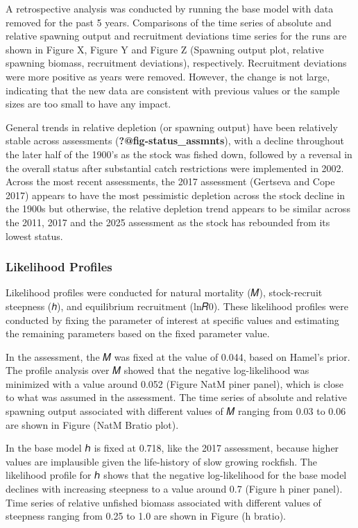 \documentclass[
]{scrartcl}
\begin{document}
A retrospective analysis was conducted by running the base model with
data removed for the past 5 years. Comparisons of the time series of
absolute and relative spawning output and recruitment deviations time
series for the runs are shown in Figure X, Figure Y and Figure Z
(Spawning output plot, relative spawning biomass, recruitment
deviations), respectively. Recruitment deviations were more positive as
years were removed. However, the change is not large, indicating that
the new data are consistent with previous values or the sample sizes are
too small to have any impact.

General trends in relative depletion (or spawning output) have been
relatively stable across assessments (\textbf{?@fig-status\_assmnts}),
with a decline throughout the later half of the 1900's as the stock was
fished down, followed by a reversal in the overall status after
substantial catch restrictions were implemented in 2002. Across the most
recent assessments, the 2017 assessment (Gertseva and Cope 2017) appears
to have the most pessimistic depletion across the stock decline in the
1900s but otherwise, the relative depletion trend appears to be similar
across the 2011, 2017 and the 2025 assessment as the stock has rebounded
from its lowest status.

\subsubsection{Likelihood Profiles}\label{likelihood-profiles}

Likelihood profiles were conducted for natural mortality (𝑀),
stock-recruit steepness (ℎ), and equilibrium recruitment (ln𝑅0). These
likelihood profiles were conducted by fixing the parameter of interest
at specific values and estimating the remaining parameters based on the
fixed parameter value.

In the assessment, the 𝑀 was fixed at the value of 0.044, based on
Hamel's prior. The profile analysis over 𝑀 showed that the negative
log-likelihood was minimized with a value around 0.052 (Figure NatM
piner panel), which is close to what was assumed in the assessment. The
time series of absolute and relative spawning output associated with
different values of 𝑀 ranging from 0.03 to 0.06 are shown in Figure
(NatM Bratio plot).

In the base model ℎ is fixed at 0.718, like the 2017 assessment, because
higher values are implausible given the life-history of slow growing
rockfish. The likelihood profile for ℎ shows that the negative
log-likelihood for the base model declines with increasing steepness to
a value around 0.7 (Figure h piner panel). Time series of relative
unfished biomass associated with different values of steepness ranging
from 0.25 to 1.0 are shown in Figure (h bratio).
\end{document}
